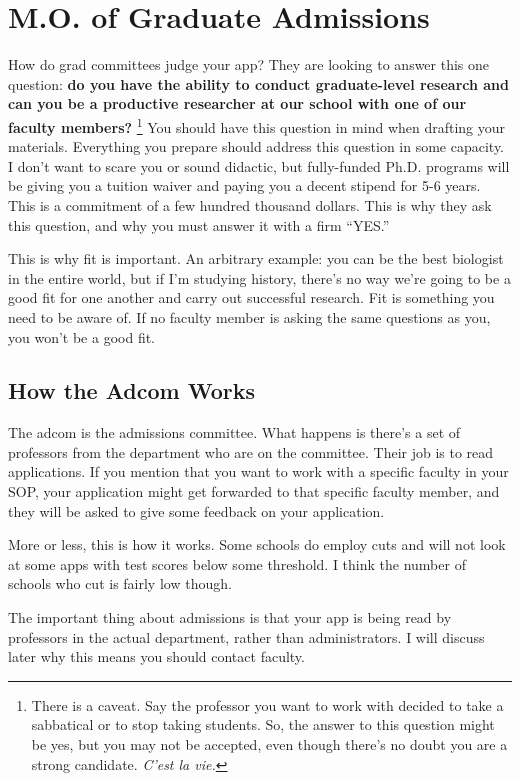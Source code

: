\documentclass[12pt]{article}
\begin{document}
\section{M.O. of Graduate Admissions}
How do grad committees judge your app? They are looking to answer this one question: \textbf{do you have the ability to conduct graduate-level research and can you be a productive researcher at our school with one of our faculty members?} \footnote{There is a caveat. Say the professor you want to work with decided to take a sabbatical or to stop taking students. So, the answer to this question might be yes, but you may not be accepted, even though there's no doubt you are a strong candidate. \textit{C'est la vie.}} You should have this question in mind when drafting your materials. Everything you prepare should address this question in some capacity. I don't want to scare you or sound didactic, but fully-funded Ph.D. programs will be giving you a tuition waiver and paying you a decent stipend for 5-6 years. This is a commitment of a few hundred thousand dollars. This is why they ask this question, and why you must answer it with a firm ``YES.''

This is why fit is important. An arbitrary example: you can be the best biologist in the entire world, but if I'm studying history, there's no way we're going to be a good fit for one another and carry out successful research. Fit is something you need to be aware of. If no faculty member is asking the same questions as you, you won't be a good fit.


\subsection{How the Adcom Works}
The adcom is the admissions committee. What happens is there's a set of professors from the department who are on the committee. Their job is to read applications. If you mention that you want to work with a specific faculty in your SOP, your application might get forwarded to that specific faculty member, and they will be asked to give some feedback on your application.

More or less, this is how it works. Some schools do employ cuts and will not look at some apps with test scores below some threshold. I think the number of schools who cut is fairly low though. 

The important thing about admissions is that your app is being read by professors in the actual department, rather than administrators. I will discuss later why this means you should contact faculty.
\end{document}
